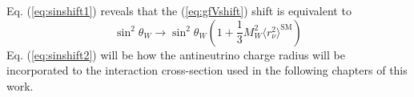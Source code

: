 Eq. (\ref{eq:sinshift1}) reveals that the (\ref{eq:gfVshift}) shift is equivalent to
\begin{equation}\label{eq:sinshift2}
    \sin^2 \theta_W \rightarrow \sin^2\theta_W\left(1 + \frac{1}{3}M_W^2\langle r^2_\nu\rangle^\text{SM}\right)
\end{equation}
Eq. (\ref{eq:sinshift2}) will be how the antineutrino charge radius will be incorporated to the interaction cross-section used in the following chapters of this work.